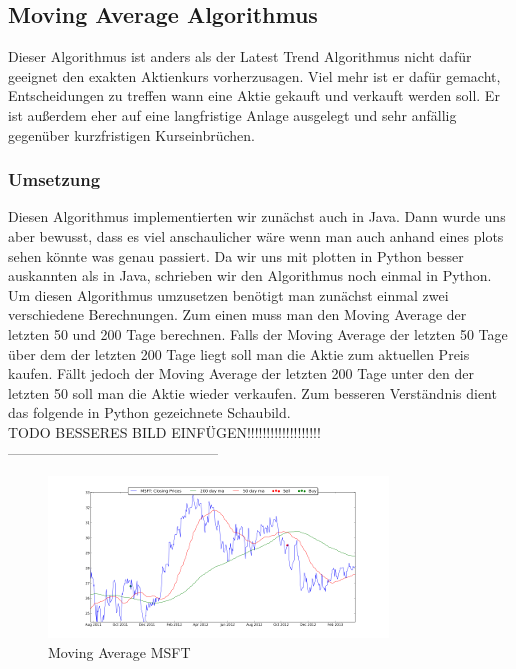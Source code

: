\documentclass[12pt]{article} %
\begin{document}

\subsection{Moving Average Algorithmus}

Dieser Algorithmus ist anders als der Latest Trend Algorithmus nicht dafür geeignet den exakten Aktienkurs vorherzusagen. Viel mehr ist er dafür gemacht, Entscheidungen zu treffen wann eine Aktie gekauft und verkauft werden soll. Er ist außerdem eher auf eine langfristige Anlage ausgelegt und sehr anfällig gegenüber kurzfristigen Kurseinbrüchen.

\subsubsection{Umsetzung}

Diesen Algorithmus implementierten wir zunächst auch in Java. Dann wurde uns aber bewusst, dass es viel anschaulicher wäre wenn man auch anhand eines plots sehen könnte was genau passiert. Da wir uns mit plotten in Python besser auskannten als in Java, schrieben wir den Algorithmus noch einmal in Python.
Um diesen Algorithmus umzusetzen benötigt man zunächst einmal zwei verschiedene Berechnungen. Zum einen muss man den Moving Average der letzten 50 und 200 Tage berechnen. Falls der Moving Average der letzten 50 Tage über dem der letzten 200 Tage liegt soll man die Aktie zum aktuellen Preis kaufen. Fällt jedoch der Moving Average der letzten 200 Tage unter den der letzten 50 soll man die Aktie wieder verkaufen. Zum besseren Verständnis dient das folgende in Python gezeichnete Schaubild.
\\TODO BESSERES BILD EINFÜGEN!!!!!!!!!!!!!!!!!!!
---------------------------------------------
\begin{figure}[!h]  
  \begin{center}
    \includegraphics[width=\textwidth]{MSFT_Zoomed}
  \end{center}
      \caption{Moving Average MSFT}
\end{figure}
\end{document}
